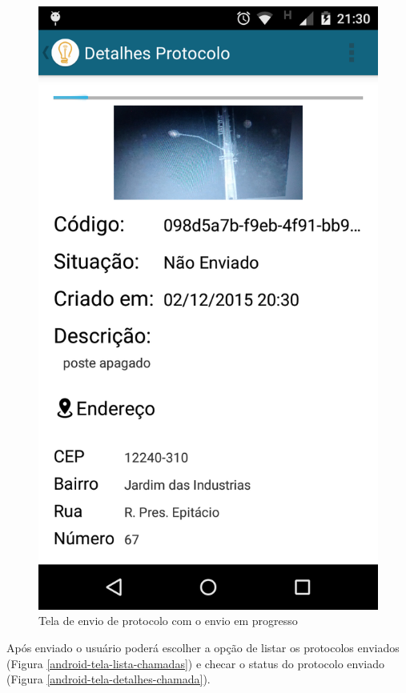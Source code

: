 \documentclass[
	article,			%
	11pt,				%
	oneside,			%
	a4paper,			%
	english,			%
	brazil,				%
	sumario=tradicional
	]{abntex2}
\begin{document}
\begin{figure}[!htbp]
\begin{minipage}{0.4\textwidth}
    \centering
    \caption{\label{android-tela-enviando}Tela de envio de protocolo com o envio em progresso}
    \includegraphics[scale=0.1]{android/6.png}
  \end{minipage}
\end{figure}

Após enviado o usuário poderá escolher a opção de listar os protocolos enviados (Figura
\ref{android-tela-lista-chamadas}) e checar o status do protocolo enviado (Figura
\ref{android-tela-detalhes-chamada}).
\end{document}
